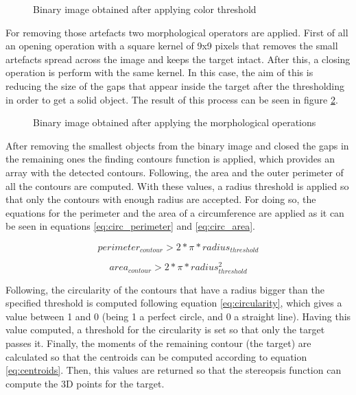 \begin{figure}[h]
    \centering
    \caption{Binary image obtained after applying color threshold}
    \label{fig:binary_image}
\end{figure}

For removing those artefacts two morphological operators are applied. First of all an opening operation with a square kernel of 9x9 pixels that removes the small artefacts spread across the image and keeps the target intact. After this, a closing operation is perform with the same kernel. In this case, the aim of this is reducing the size of the gaps that appear inside the target after the thresholding in order to get a solid object. The result of this process can be seen in figure \ref{fig:filtered_image}.

\begin{figure}[h]
    \centering
    \caption{Binary image obtained after applying the morphological operations}
    \label{fig:filtered_image}
\end{figure}

After removing the smallest objects from the binary image and closed the gaps in the remaining ones the finding contours function is applied, which provides an array with the detected contours. Following, the area and the outer perimeter of all the contours are computed. With these values, a radius threshold is applied so that only the contours with enough radius are accepted. For doing so, the equations for the perimeter and the area of a circumference are applied as it can be seen in equations \ref{eq:circ_perimeter} and \ref{eq:circ_area}.

\begin{equation}
perimeter_{contour}>2*\pi*radius_{threshold}
\label{eq:circ_perimeter}
\end{equation}

\begin{equation}
area_{contour}>2*\pi*radius_{threshold}^{2}
\label{eq:circ_area}
\end{equation}

Following, the circularity of the contours that have a radius bigger than the specified threshold is computed following equation \ref{eq:circularity}, which gives a value between 1 and 0 (being 1 a perfect circle, and 0 a straight line). Having this value computed, a threshold for the circularity is set so that only the target passes it. Finally, the moments of the remaining contour (the target) are calculated so that the centroids can be computed according to equation \ref{eq:centroids}. Then, this values are returned so that the stereopsis function can compute the 3D points for the target.

